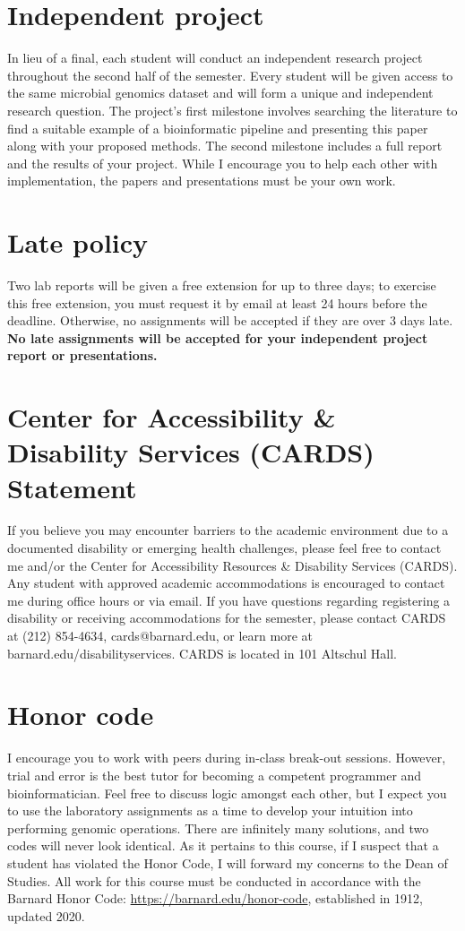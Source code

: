 \documentclass{article}
\begin{document}
\section*{Independent project}
In lieu of a final, each student will conduct an independent research project throughout the second half of the semester. Every student will be given access to the same microbial genomics dataset and will form a unique and independent research question. The project’s first milestone involves searching the literature to find a suitable example of a bioinformatic pipeline and presenting this paper along with your proposed methods. The second milestone includes a full report and the results of your project. While I encourage you to help each other with implementation, the papers and presentations must be your own work. 

\section*{Late policy}
Two lab reports will be given a free extension for up to three days; to exercise this free extension, you must request it by email at least 24 hours before the deadline. Otherwise, no assignments will be accepted if they are over 3 days late. \textbf{No late assignments will be accepted for your independent project report or presentations.}

\section*{Center for Accessibility \& Disability Services (CARDS) Statement}
If you believe you may encounter barriers to the academic environment due to a documented disability or emerging health challenges, please feel free to contact me and/or the Center for Accessibility Resources \& Disability Services (CARDS). Any student with approved academic accommodations is encouraged to contact me during office hours or via email. If you have questions regarding registering a disability or receiving accommodations for the semester, please contact CARDS at (212) 854-4634, cards@barnard.edu, or learn more at barnard.edu/disabilityservices. CARDS is located in 101 Altschul Hall. 

\section*{Honor code}
I encourage you to work with peers during in-class break-out sessions. However, trial and error is the best tutor for becoming a competent programmer and bioinformatician. Feel free to discuss logic amongst each other, but I expect you to use the laboratory assignments as a time to develop your intuition into performing genomic operations. There are infinitely many solutions, and two codes will never look identical. As it pertains to this course, if I suspect that a student has violated the Honor Code, I will forward my concerns to the Dean of Studies. All work for this course must be conducted in accordance with the Barnard Honor Code: \url{https://barnard.edu/honor-code}, established in 1912, updated 2020.
\end{document}
